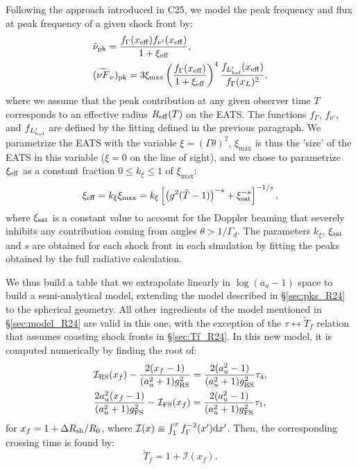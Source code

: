 \documentclass{article}
\newcommand{\sh}{{\rm sh}}
\newcommand{\pk}{{\rm pk}}
\newcommand{\bol}{{\rm bol}}
\newcommand{\eff}{{\rm eff}}
\newcommand{\RS}{{\rm RS}}
\newcommand{\FS}{{\rm FS}}
\begin{document}
Following the approach introduced in C25, we model the peak frequency and flux at peak frequency of a given shock front by:
\begin{align}
    &\tilde{\nu}_\pk = \frac{f_\Gamma(x_\eff)f_{\nu'}(x_\eff)}{1+\xi_\eff},\label{eqn:nupk_C25}\\
    &(\widetilde{\nu F}_\nu)_\pk = 3\xi_{\max}  \left(\frac{f_\Gamma(x_\eff)}{1+\xi_\eff}\right)^4\frac{f_{L'_\bol}(x_\eff)}{f_\Gamma(x_L)^2},\label{eqn:nFpk_C25}
\end{align}
where we assume that the peak contribution at any given observer time $T$ corresponds to an effective radius $R_\eff(T)$ on the EATS. The functions $f_\Gamma$, $f_{\nu'}$, and $f_{L'_\bol}$ are defined by the fitting defined in the previous paragraph. We parametrize the EATS with the variable $\xi=(\Gamma\theta)^2$, $\xi_{\max}$ is thus the 'size' of the EATS in this variable ($\xi=0$ on the line of sight), and we chose to parametrize $\xi_\eff$ as a constant fraction $0\leq k_\xi\leq1$ of $\xi_{\max}$:
\begin{equation}
    \xi_{\rm eff} = k_\xi \xi_{\max} = k_\xi \left[\left(g^2(\tilde{T}-1)\right)^{-s}+\xi_{\rm sat}^{-s} \right]^{-1/s},\label{eqn:xieff}
\end{equation}
where $\xi_{\rm sat}$ is a constant value to account for the Doppler beaming that severely inhibits any contribution coming from angles $\theta>1/\Gamma_d$. The parameters $k_\xi$, $\xi_{\rm sat}$ and $s$ are obtained for each shock front in each simulation by fitting the peaks obtained by the full radiative calculation.

We thus build a table that we extrapolate linearly in $\log(a_u-1)$ space to build a semi-analytical model, extending the model described in \S \ref{sec:pks_R24} to the spherical geometry. All other ingredients of the model mentioned in \S \ref{sec:model_R24} are valid in this one, with the exception of the $\tau\leftrightarrow\tilde{T}_f$ relation that assumes coasting shock fronts in \S \ref{sec:Tf_R24}. In this new model, it is computed numerically by finding the root of:
\begin{align}
    &\mathcal{I}_\RS(x_f) - \frac{2(x_f-1)}{(a_u^2+1)g_\RS^2} = \frac{2(a_u^2-1)}{(a_u^2+1)g_\RS^2} \tau_4, \label{eqn:xffromtau_RS} \\
    &\frac{2a_u^2(x_f-1)}{(a_u^2+1)g_\FS^2} - \mathcal{I}_\FS(x_f) = \frac{2(a_u^2-1)}{(a_u^2+1)g_\FS^2} \tau_1, \label{eqn:xffromtau_FS}
\end{align}
for $x_f=1+\Delta R_\sh/R_0$, where $\mathcal{I}(x)\equiv\int_1^x f_\Gamma^{-2}(x'){\rm d}x'$. Then, the corresponding crossing time is found by:
\begin{equation}
    \tilde{T}_f= 1 + \mathcal{I}(x_f).
\end{equation}
\end{document}
